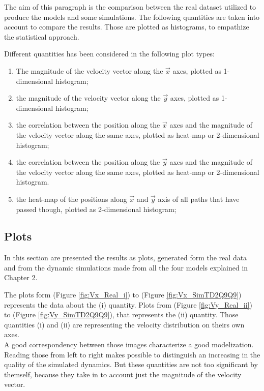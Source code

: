 \documentclass[class=article, crop=false]{standalone}
\begin{document}
The aim of this paragraph is the comparison between the real dataset utilized to produce the models and some simulations.
The following quantities are taken into account to compare the results.
Those are plotted as histograms, to empathize the statistical approach.

Different quantities has been considered in the following plot types:
\begin{enumerate}[label=(\roman*)]
\item The magnitude of the velocity vector along the $\vec x$ axes, plotted as 1-dimensional histogram;
\item the magnitude of the velocity vector along the $\vec y$ axes, plotted as 1-dimensional histogram;
\item the correlation between the position along the $\vec x$ axes and the magnitude of the velocity vector along the same axes, plotted as heat-map or 2-dimensional histogram;
\item the correlation between the position along the $\vec y$ axes and the magnitude of the velocity vector along the same axes, plotted as heat-map or 2-dimensional histogram.
\item the heat-map of the positions along $\vec x$ and $\vec y$ axis of all paths that have passed though, plotted as 2-dimensional histogram;
\end{enumerate}

\FloatBarrier
\subsection{Plots}
In this section are presented the results as plots, generated form the real data and from the dynamic simulations made from all the four models explained in Chapter 2.

The plots form (Figure \ref{fig:Vx_Real_i}) to (Figure \ref{fig:Vx_SimTD2Q9Q9}) represents the data about the (i) quantity.
Plots from (Figure \ref{fig:Vy_Real_ii}) to (Figure \ref{fig:Vy_SimTD2Q9Q9}), that represents the (ii) quantity.
Those quantities (i) and (ii) are representing the velocity distribution on theirs own axes.
\\ A good correspondency between those images characterize a good modelization.
Reading those from left to right makes possible to distinguish an increasing in the quality of the simulated dynamics.
But these quantities are not too significant by themself, because they take in to account just the magnitude of the velocity vector.
\end{document}

